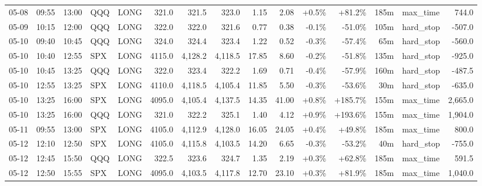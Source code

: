 \documentclass[11pt,a4paper,twoside]{article}
\begin{document}
\begin{landscape}
\begin{center}
\begin{longtable}{>{\color{txtmain}}l l l l l r r r r r r r r >{\color{txtmain}}l r}
05-08 & 09:55 & 13:00 & QQQ & LONG & 321.0 & 321.5 & 323.0 & 1.15 & 2.08 & \textcolor{wingreen}{+0.5\%} & \textcolor{wingreen}{+81.2\%} & 185m & max\_time & \textcolor{wingreen}{744.0} \\
05-09 & 10:15 & 12:00 & QQQ & LONG & 322.0 & 322.0 & 321.6 & 0.77 & 0.38 & \textcolor{lossred}{-0.1\%} & \textcolor{lossred}{-51.0\%} & 105m & hard\_stop & \textcolor{lossred}{-507.0} \\
05-10 & 09:40 & 10:45 & QQQ & LONG & 324.0 & 324.4 & 323.4 & 1.22 & 0.52 & \textcolor{lossred}{-0.3\%} & \textcolor{lossred}{-57.4\%} & 65m & hard\_stop & \textcolor{lossred}{-560.0} \\
05-10 & 10:40 & 12:55 & SPX & LONG & 4115.0 & 4,128.2 & 4,118.5 & 17.85 & 8.60 & \textcolor{lossred}{-0.2\%} & \textcolor{lossred}{-51.8\%} & 135m & hard\_stop & \textcolor{lossred}{-925.0} \\
05-10 & 10:45 & 13:25 & QQQ & LONG & 322.0 & 323.4 & 322.2 & 1.69 & 0.71 & \textcolor{lossred}{-0.4\%} & \textcolor{lossred}{-57.9\%} & 160m & hard\_stop & \textcolor{lossred}{-487.5} \\
05-10 & 12:55 & 13:25 & SPX & LONG & 4110.0 & 4,118.5 & 4,105.4 & 11.85 & 5.50 & \textcolor{lossred}{-0.3\%} & \textcolor{lossred}{-53.6\%} & 30m & hard\_stop & \textcolor{lossred}{-635.0} \\
05-10 & 13:25 & 16:00 & SPX & LONG & 4095.0 & 4,105.4 & 4,137.5 & 14.35 & 41.00 & \textcolor{wingreen}{+0.8\%} & \textcolor{wingreen}{+185.7\%} & 155m & max\_time & \textcolor{wingreen}{2,665.0} \\
05-10 & 13:25 & 16:00 & QQQ & LONG & 321.0 & 322.2 & 325.1 & 1.40 & 4.12 & \textcolor{wingreen}{+0.9\%} & \textcolor{wingreen}{+193.6\%} & 155m & max\_time & \textcolor{wingreen}{1,904.0} \\
05-11 & 09:55 & 13:00 & SPX & LONG & 4105.0 & 4,112.9 & 4,128.0 & 16.05 & 24.05 & \textcolor{wingreen}{+0.4\%} & \textcolor{wingreen}{+49.8\%} & 185m & max\_time & \textcolor{wingreen}{800.0} \\
05-12 & 12:10 & 12:50 & SPX & LONG & 4105.0 & 4,115.8 & 4,103.5 & 14.20 & 6.65 & \textcolor{lossred}{-0.3\%} & \textcolor{lossred}{-53.2\%} & 40m & hard\_stop & \textcolor{lossred}{-755.0} \\
05-12 & 12:45 & 15:50 & QQQ & LONG & 322.5 & 323.6 & 324.7 & 1.35 & 2.19 & \textcolor{wingreen}{+0.3\%} & \textcolor{wingreen}{+62.8\%} & 185m & max\_time & \textcolor{wingreen}{591.5} \\
05-12 & 12:50 & 15:55 & SPX & LONG & 4095.0 & 4,103.5 & 4,117.8 & 12.70 & 23.10 & \textcolor{wingreen}{+0.3\%} & \textcolor{wingreen}{+81.9\%} & 185m & max\_time & \textcolor{wingreen}{1,040.0} \\

\end{longtable}
\end{center}
\end{landscape}
\end{document}
